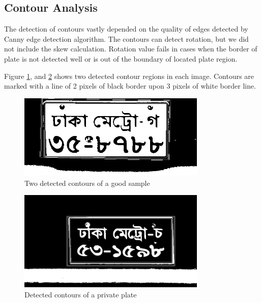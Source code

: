 \subsection{Contour Analysis}
The detection of contours vastly depended on the quality of edges detected by Canny edge detection algorithm. The contours can detect rotation, but we did not include the skew calculation. Rotation value fails in cases when the border of plate is not detected well or is out of the boundary of located plate region.

Figure \ref{fig:ContourResult1}, and \ref{fig:ContourResult2} shows two detected contour regions in each image. Contours are marked with a line of 2 pixels of black border upon 3 pixels of white border line.

\begin{figure}
\centering
\includegraphics[width=0.8\textwidth]{./img/experiment/stage.12/00-good}   
\caption{Two detected contours of a good sample}
\label{fig:ContourResult1}
\end{figure}

\begin{figure}
\centering
\includegraphics[width=0.8\textwidth]{./img/experiment/stage.12/00-private2}
\caption{Detected contours of a private plate}
\label{fig:ContourResult2}
\end{figure}

